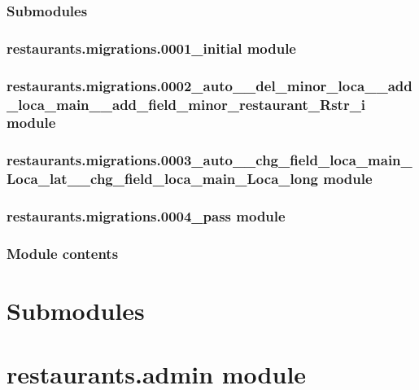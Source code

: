 \documentclass[letterpaper,10pt,english]{sphinxmanual}
\begin{document}
\subsubsection{Submodules}
\label{restaurants.migrations:submodules}

\subsubsection{restaurants.migrations.0001\_initial module}
\label{restaurants.migrations:restaurants-migrations-0001-initial-module}

\subsubsection{restaurants.migrations.0002\_auto\_\_del\_minor\_loca\_\_add\_loca\_main\_\_add\_field\_minor\_restaurant\_Rstr\_i module}
\label{restaurants.migrations:restaurants-migrations-0002-auto-del-minor-loca-add-loca-main-add-field-minor-restaurant-rstr-i-module}

\subsubsection{restaurants.migrations.0003\_auto\_\_chg\_field\_loca\_main\_Loca\_lat\_\_chg\_field\_loca\_main\_Loca\_long module}
\label{restaurants.migrations:restaurants-migrations-0003-auto-chg-field-loca-main-loca-lat-chg-field-loca-main-loca-long-module}

\subsubsection{restaurants.migrations.0004\_pass module}
\label{restaurants.migrations:restaurants-migrations-0004-pass-module}

\subsubsection{Module contents}
\label{restaurants.migrations:module-contents}\label{restaurants.migrations:module-restaurants.migrations}

\section{Submodules}
\label{restaurants:submodules}

\section{restaurants.admin module}
\label{restaurants:restaurants-admin-module}
\end{document}
